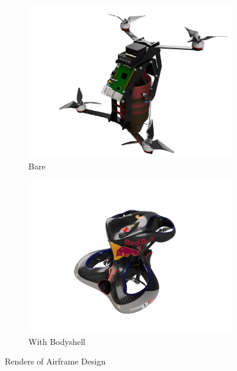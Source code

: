 \documentclass[11pt,twoside]{article}
\begin{document}
\begin{figure}[h]
    \begin{subfigure}{0.48\textwidth}
        \includegraphics[width=\linewidth]{saucy_render_bare}
        \caption{Bare}
        \label{fig:saucy_render_bare}
    \end{subfigure}\hspace*{\fill}
    \begin{subfigure}{0.48\textwidth}
        \includegraphics[width=\linewidth]{saucy_render_w_bodyshell}
        \caption{With Bodyshell}
        \label{fig:saucy_render_w_bodyshell}
    \end{subfigure}

    \caption{Renders of Airframe Design}
    \label{fig:saucy_render}
\end{figure}
\end{document}
